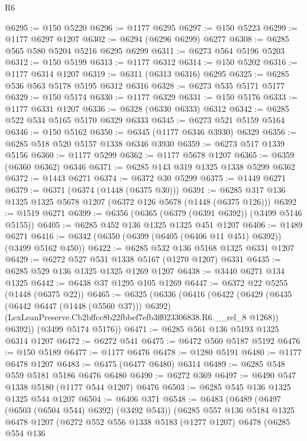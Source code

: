 \begin{lexlean}{R6}
\begin{coremodule}
@6295 := @150 @5220
@6296 := @1177 @6295
@6297 := @150 @5223
@6299 := @1177 @6297 @1207
@6302 := @6294 (@6296 @6299) @6277
@6308 := @6285 @565 @580 @5204 @5216 @6295 @6299
@6311 := @6273 @564 @5196 @5203
@6312 := @150 @5199
@6313 := @1177 @6312
@6314 := @150 @5202
@6316 := @1177 @6314 @1207
@6319 := @6311 (@6313 @6316) @6295
@6325 := @6285 @536 @563 @5178 @5195 @6312 @6316
@6328 := @6273 @535 @5171 @5177
@6329 := @150 @5174
@6330 := @1177 @6329
@6331 := @150 @5176
@6333 := @1177 @6331 @1207
@6336 := @6328 (@6330 @6333) @6312
@6342 := @6285 @522 @534 @5165 @5170 @6329 @6333
@6345 := @6273 @521 @5159 @5164
@6346 := @150 @5162
@6350 := @6345 (@1177 @6346 @3930) @6329
@6356 := @6285 @518 @520 @5157 @1338 @6346 @3930
@6359 := @6273 @517 @1339 @5156
@6360 := @1177 @5299
@6362 := @1177 @5678 @1207
@6365 := @6359 (@6360 @6362) @6346
@6371 := @6285 @143 @319 @1325 @1338 @5299 @6362
@6372 := @1443 @6271
@6374 := @6372 @30 @5299
@6375 := @1449 @6271
@6379 := @6371 (@6374 (@1448 (@6375 @30)))
@6391 := @6285 @317 @136 @1325 @1325 @5678 @1207 (@6372 @126 @5678 (@1448 (@6375 @126)))
@6392 := @1519 @6271
@6399 := @6356 (@6365 (@6379 (@6391 @6392)) (@3499 @5146 @5155))
@6405 := @6285 @452 @136 @1325 @1325 @451 @1207
@6406 := @1489 @6271
@6416 := @6342 (@6350 (@6399 (@6405 (@6406 @11 @451) @6392)) (@3499 @5162 @450))
@6422 := @6285 @532 @136 @5168 @1325 @6331 @1207
@6429 := @6272 @527 @531 @1338 @5167 (@1270 @1207) @6331
@6435 := @6285 @529 @136 @1325 @1325 @1269 @1207
@6438 := @3440 @6271 @134 @1325
@6442 := @6438 @37 @1295 @105 @1269
@6447 := @6372 @22 @5255 (@1448 (@6375 @22))
@6465 := @6325
    (@6336
      (@6416
        (@6422
          (@6429
            (@6435 (@6442 @6447 (@1448 (@5560 @37))) @6392)
            (LexLeanPreserve.Cb2bffcc8b22fbbef7efb3ff023306838.R6.__rel_8 @1268))
          @6392))
      (@3499 @5174 @5176))
@6471 := @6285 @561 @136 @5193 @1325 @6314 @1207
@6472 := @6272 @541
@6475 := @6472 @560 @5187 @5192
@6476 := @150 @5189
@6477 := @1177 @6476
@6478 := @1280 @5191
@6480 := @1177 @6478 @1207
@6483 := @6475 (@6477 @6480) @6314
@6489 := @6285 @548 @559 @5181 @5186 @6476 @6480
@6490 := @6272 @369
@6497 := @6490 @547 @1338 @5180 (@1177 @544 @1207) @6476
@6503 := @6285 @545 @136 @1325 @1325 @544 @1207
@6504 := @6406 @371
@6548 := @6483
    (@6489
      (@6497 (@6503 (@6504 @544) @6392) (@3492 @543))
      (@6285
        @557
        @136
        @5184
        @1325
        @6478
        @1207
        (@6272
          @552
          @556
          @1338
          @5183
          (@1277 @1207)
          @6478
          (@6285
            @554
            @136

\end{coremodule}
\end{lexlean}
